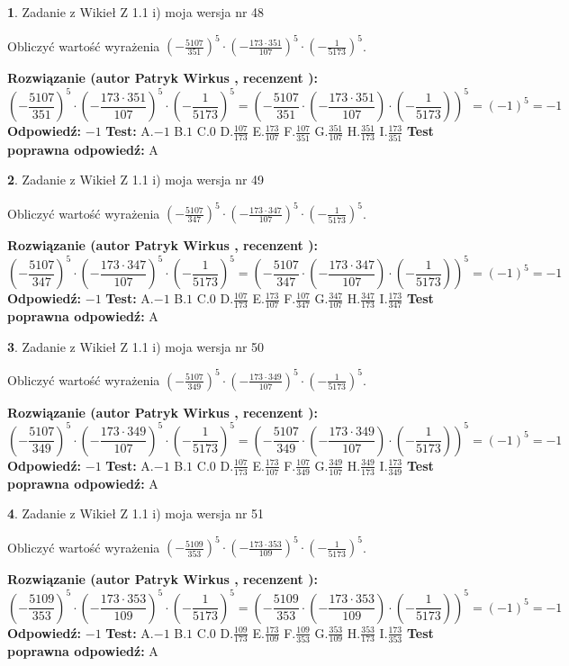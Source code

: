 \documentclass[12pt, a4paper]{article}
\theoremstyle{definition} %
\newtheorem{zad}{}
\newcommand{\zadStart}[1]{\begin{zad}#1\newline}
\newcommand{\zadStop}{\end{zad}}
\newcommand{\rozwStart}[2]{\noindent \textbf{Rozwiązanie (autor #1 , recenzent #2): }\newline}
\newcommand{\rozwStop}{\newline}
\newcommand{\odpStart}{\noindent \textbf{Odpowiedź:}\newline}
\newcommand{\odpStop}{\newline}
\newcommand{\testStart}{\noindent \textbf{Test:}\newline}
\newcommand{\testStop}{\newline}
\newcommand{\kluczStart}{\noindent \textbf{Test poprawna odpowiedź:}\newline}
\newcommand{\kluczStop}{\newline}
\begin{document}
\zadStart{Zadanie z Wikieł Z 1.1 i) moja wersja nr 48}

Obliczyć wartość wyrażenia $(-\frac{5107}{351})^{5} \cdot (-\frac{173 \cdot 351}{107})^{5} \cdot (-\frac{1}{5173})^{5}$.
\zadStop
\rozwStart{Patryk Wirkus}{}
$$(-\frac{5107}{351})^{5} \cdot (-\frac{173 \cdot 351}{107})^{5} \cdot (-\frac{1}{5173})^{5} = (-\frac{5107}{351} \cdot (-\frac{173 \cdot 351}{107}) \cdot (-\frac{1}{5173}))^{5} = (-1)^{5} = -1$$
\rozwStop
\odpStart
$-1$
\odpStop
\testStart
A.$-1$ B.$1$ C.$0$ D.$\frac{107}{173}$ E.$\frac{173}{107}$
F.$\frac{107}{351}$ G.$\frac{351}{107}$
H.$\frac{351}{173}$
I.$\frac{173}{351}$
\testStop
\kluczStart
A
\kluczStop



\zadStart{Zadanie z Wikieł Z 1.1 i) moja wersja nr 49}

Obliczyć wartość wyrażenia $(-\frac{5107}{347})^{5} \cdot (-\frac{173 \cdot 347}{107})^{5} \cdot (-\frac{1}{5173})^{5}$.
\zadStop
\rozwStart{Patryk Wirkus}{}
$$(-\frac{5107}{347})^{5} \cdot (-\frac{173 \cdot 347}{107})^{5} \cdot (-\frac{1}{5173})^{5} = (-\frac{5107}{347} \cdot (-\frac{173 \cdot 347}{107}) \cdot (-\frac{1}{5173}))^{5} = (-1)^{5} = -1$$
\rozwStop
\odpStart
$-1$
\odpStop
\testStart
A.$-1$ B.$1$ C.$0$ D.$\frac{107}{173}$ E.$\frac{173}{107}$
F.$\frac{107}{347}$ G.$\frac{347}{107}$
H.$\frac{347}{173}$
I.$\frac{173}{347}$
\testStop
\kluczStart
A
\kluczStop



\zadStart{Zadanie z Wikieł Z 1.1 i) moja wersja nr 50}

Obliczyć wartość wyrażenia $(-\frac{5107}{349})^{5} \cdot (-\frac{173 \cdot 349}{107})^{5} \cdot (-\frac{1}{5173})^{5}$.
\zadStop
\rozwStart{Patryk Wirkus}{}
$$(-\frac{5107}{349})^{5} \cdot (-\frac{173 \cdot 349}{107})^{5} \cdot (-\frac{1}{5173})^{5} = (-\frac{5107}{349} \cdot (-\frac{173 \cdot 349}{107}) \cdot (-\frac{1}{5173}))^{5} = (-1)^{5} = -1$$
\rozwStop
\odpStart
$-1$
\odpStop
\testStart
A.$-1$ B.$1$ C.$0$ D.$\frac{107}{173}$ E.$\frac{173}{107}$
F.$\frac{107}{349}$ G.$\frac{349}{107}$
H.$\frac{349}{173}$
I.$\frac{173}{349}$
\testStop
\kluczStart
A
\kluczStop



\zadStart{Zadanie z Wikieł Z 1.1 i) moja wersja nr 51}

Obliczyć wartość wyrażenia $(-\frac{5109}{353})^{5} \cdot (-\frac{173 \cdot 353}{109})^{5} \cdot (-\frac{1}{5173})^{5}$.
\zadStop
\rozwStart{Patryk Wirkus}{}
$$(-\frac{5109}{353})^{5} \cdot (-\frac{173 \cdot 353}{109})^{5} \cdot (-\frac{1}{5173})^{5} = (-\frac{5109}{353} \cdot (-\frac{173 \cdot 353}{109}) \cdot (-\frac{1}{5173}))^{5} = (-1)^{5} = -1$$
\rozwStop
\odpStart
$-1$
\odpStop
\testStart
A.$-1$ B.$1$ C.$0$ D.$\frac{109}{173}$ E.$\frac{173}{109}$
F.$\frac{109}{353}$ G.$\frac{353}{109}$
H.$\frac{353}{173}$
I.$\frac{173}{353}$
\testStop
\kluczStart
A
\kluczStop
\end{document}
